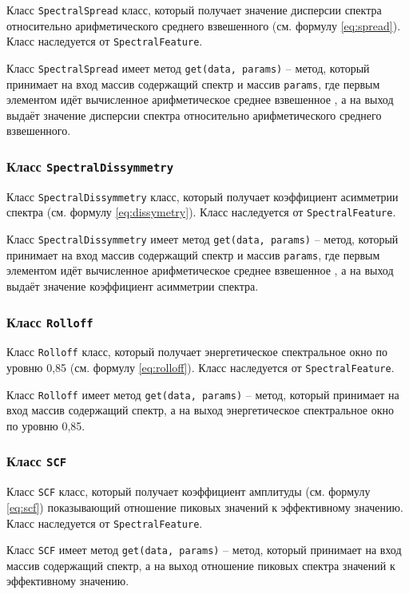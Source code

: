 Класс \texttt{SpectralSpread} класс, который получает значение дисперсии спектра относительно арифметического среднего взвешенного (см. формулу \ref{eq:spread}). Класс наследуется от \texttt{SpectralFeature}.

Класс \texttt{SpectralSpread} имеет метод \texttt{get(data, params)} --  метод, который принимает на вход массив содержащий спектр и массив \texttt{params}, где первым элементом идёт вычисленное арифметическое среднее взвешенное , а на выход выдаёт значение  дисперсии спектра относительно арифметического среднего взвешенного.

\subsubsection{Класс \texttt{SpectralDissymmetry}}

Класс \texttt{SpectralDissymmetry} класс, который получает коэффициент асимметрии спектра (см. формулу \ref{eq:dissymetry}). Класс наследуется от \texttt{SpectralFeature}.

Класс \texttt{SpectralDissymmetry} имеет метод \texttt{get(data, params)} --  метод, который принимает на вход массив содержащий спектр и массив \texttt{params}, где первым элементом идёт вычисленное арифметическое среднее взвешенное , а на выход выдаёт значение коэффициент асимметрии спектра.

\subsubsection{Класс \texttt{Rolloff}}

Класс \texttt{Rolloff} класс, который получает энергетическое спектральное окно по уровню 0,85 (см. формулу \ref{eq:rolloff}). Класс наследуется от \texttt{SpectralFeature}.

Класс \texttt{Rolloff} имеет метод \texttt{get(data, params)} --  метод, который принимает на вход массив содержащий спектр, а на выход энергетическое спектральное окно по уровню 0,85.

\subsubsection{Класс \texttt{SCF}}

Класс \texttt{SCF} класс, который получает коэффициент амплитуды (см. формулу \ref{eq:scf}) показывающий отношение пиковых значений к эффективному значению. Класс наследуется от \texttt{SpectralFeature}.

Класс \texttt{SCF} имеет метод \texttt{get(data, params)} --  метод, который принимает на вход массив содержащий спектр, а на выход отношение пиковых спектра значений к эффективному значению.

